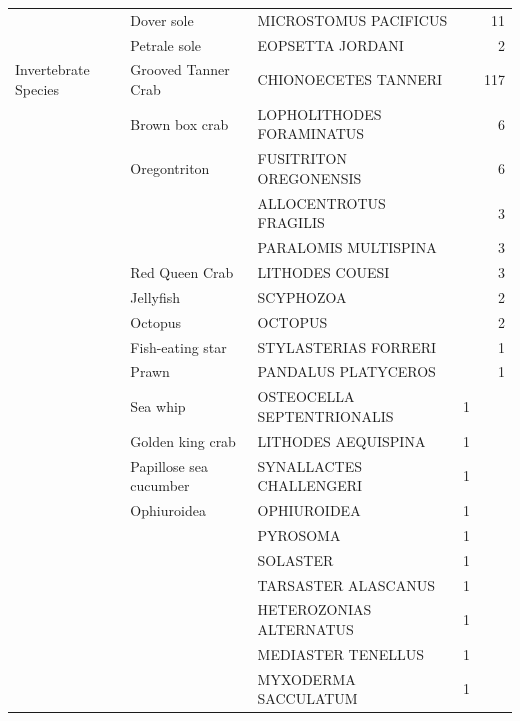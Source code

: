 \documentclass[12pt]{article}\usepackage[]{graphicx}\usepackage[]{color}
\begin{document}
\begin{table}[!h]
\begin{tabular}[t]{lllrr}
 & Dover sole & MICROSTOMUS PACIFICUS &  & 11\\
 & Petrale sole & EOPSETTA JORDANI &  & 2\\
\midrule
Invertebrate Species & Grooved Tanner Crab & CHIONOECETES TANNERI &  & 117\\
 & Brown box crab & LOPHOLITHODES FORAMINATUS &  & 6\\
 & Oregontriton & FUSITRITON OREGONENSIS &  & 6\\
 &  & ALLOCENTROTUS FRAGILIS &  & 3\\
 &  & PARALOMIS MULTISPINA &  & 3\\
 & Red Queen Crab & LITHODES COUESI &  & 3\\
 & Jellyfish & SCYPHOZOA &  & 2\\
 & Octopus & OCTOPUS &  & 2\\
 & Fish-eating star & STYLASTERIAS FORRERI &  & 1\\
 & Prawn & PANDALUS PLATYCEROS &  & 1\\
 & Sea whip & OSTEOCELLA SEPTENTRIONALIS & 1 & \\
 & Golden king crab & LITHODES AEQUISPINA & 1 & \\
 & Papillose sea cucumber & SYNALLACTES CHALLENGERI & 1 & \\
 & Ophiuroidea & OPHIUROIDEA & 1 & \\
 &  & PYROSOMA & 1 & \\
 &  & SOLASTER & 1 & \\
 &  & TARSASTER ALASCANUS & 1 & \\
 &  & HETEROZONIAS ALTERNATUS & 1 & \\
 &  & MEDIASTER TENELLUS & 1 & \\
 &  & MYXODERMA SACCULATUM & 1 & \\
\bottomrule
\end{tabular}
\end{table}
\clearpage
\end{document}
